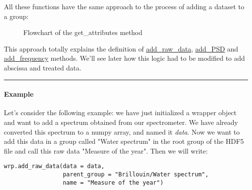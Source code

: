 All these functions have the same approach to the process of adding a dataset to a group:

\begin{figure}[H]
    \centering
    \label{fig:wrapper.flowchart_add_functions}
    \small
    \caption{Flowchart of the get\_attributes method}
\end{figure}

This approach totally explains the definition of \hyperref[subsec:wrapper.add_raw_data]{add\_raw\_data}, \hyperref[subsec:wrapper.add_psd]{add\_PSD} and \hyperref[subsec:wrapper.add_frequency]{add\_frequency} methods. We'll see later how this logic had to be modified to add abscissa and treated data.

\begin{center}
    \rule{15cm}{0.4pt}
\end{center}

\paragraph{Example}
Let's consider the following example: we have just initialized a wrapper object and want to add a spectrum obtained from our spectrometer. We have already converted this spectrum to a numpy array, and named it \textit{data}. Now we want to add this data in a group called "Water spectrum" in the root group of the HDF5 file and call this raw data "Measure of the year". Then we will write:
\begin{lstlisting}
wrp.add_raw_data(data = data,
                 parent_group = "Brillouin/Water spectrum", 
                 name = "Measure of the year")
\end{lstlisting}

